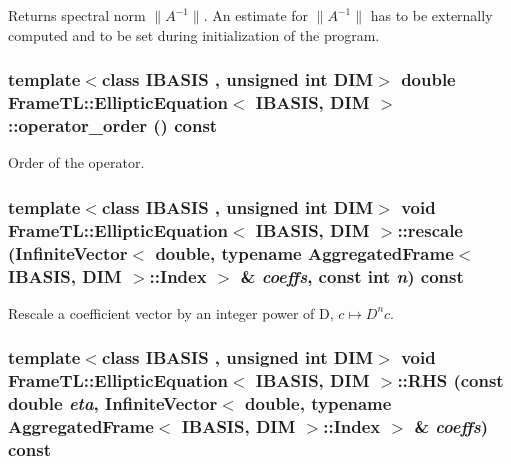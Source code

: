 Returns spectral norm $\|A^{-1}\|$. An estimate for $\|A^{-1}\|$ has to be externally computed and to be set during initialization of the program. \hypertarget{classFrameTL_1_1EllipticEquation_a5b30bbacf5d024873268eb979e65748}{
\subsubsection[{operator\_\-order}]{\setlength{\rightskip}{0pt plus 5cm}template$<$class IBASIS , unsigned int DIM$>$ double {\bf FrameTL::EllipticEquation}$<$ IBASIS, DIM $>$::operator\_\-order () const}}
\label{classFrameTL_1_1EllipticEquation_a5b30bbacf5d024873268eb979e65748}


Order of the operator. \hypertarget{classFrameTL_1_1EllipticEquation_ce9d2d6b07a48454f4f2ca76908a665a}{
\subsubsection[{rescale}]{\setlength{\rightskip}{0pt plus 5cm}template$<$class IBASIS , unsigned int DIM$>$ void {\bf FrameTL::EllipticEquation}$<$ IBASIS, DIM $>$::rescale (InfiniteVector$<$ double, typename {\bf AggregatedFrame}$<$ IBASIS, DIM $>$::{\bf Index} $>$ \& {\em coeffs}, \/  const int {\em n}) const}}
\label{classFrameTL_1_1EllipticEquation_ce9d2d6b07a48454f4f2ca76908a665a}


Rescale a coefficient vector by an integer power of D, $c \mapsto D^{n}c$. \hypertarget{classFrameTL_1_1EllipticEquation_b0efc4d40ed2a12db9c8af7d195b210b}{
\subsubsection[{RHS}]{\setlength{\rightskip}{0pt plus 5cm}template$<$class IBASIS , unsigned int DIM$>$ void {\bf FrameTL::EllipticEquation}$<$ IBASIS, DIM $>$::RHS (const double {\em eta}, \/  InfiniteVector$<$ double, typename {\bf AggregatedFrame}$<$ IBASIS, DIM $>$::{\bf Index} $>$ \& {\em coeffs}) const}}
\label{classFrameTL_1_1EllipticEquation_b0efc4d40ed2a12db9c8af7d195b210b}


